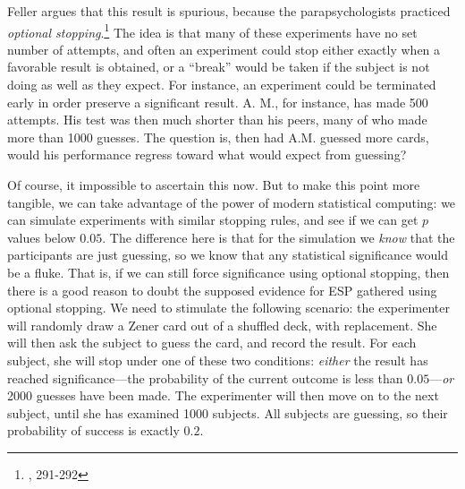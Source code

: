 Feller argues that this result is spurious, because the
parapsychologists practiced \emph{optional stopping}.\footnote{\cite{felleresp}, 291-292} The idea is that
many of these experiments have no set number of attempts, and often
an experiment could stop either exactly when a favorable result is
obtained, or a ``break'' would be taken if the subject is not doing as well as they expect. For instance, an experiment could be terminated early in order
preserve a significant result. A. M., for instance, has made 500
attempts. His test was then much shorter than his peers, many of who
made more than 1000 guesses. The question is, then had A.M. guessed more cards, would his performance regress toward what would expect from guessing? 

Of course, it impossible to ascertain this now. But to make this point more tangible, we can take advantage of the power of modern
statistical computing: we can simulate experiments with similar stopping
rules, and see if we can get $p$ values below $0.05$. The difference here is that for the simulation we \emph{know}
that the participants are just guessing, so we know that any statistical significance would be a fluke. That is, if we can still force
significance using optional stopping, then there is a good reason to
doubt the supposed evidence for ESP gathered using optional stopping. We need to stimulate the following scenario: the experimenter will randomly draw a Zener card out of a shuffled deck, with replacement.
She will then ask the subject to guess the card, and record the result.
For each subject, she will stop under one of these two conditions: \emph{either} the result has reached significance---the probability of the current outcome is less than \(0.05\)---\emph{or} 2000 guesses have been made. The
experimenter will then move on to the next subject, until she has
examined 1000 subjects. All subjects are guessing, so their probability
of success is exactly \(0.2\).

